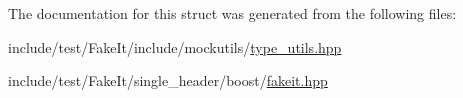 The documentation for this struct was generated from the following files\+:\begin{DoxyCompactItemize}
\item 
include/test/\+Fake\+It/include/mockutils/\mbox{\hyperlink{type__utils_8hpp}{type\+\_\+utils.\+hpp}}\item 
include/test/\+Fake\+It/single\+\_\+header/boost/\mbox{\hyperlink{single__header_2boost_2fakeit_8hpp}{fakeit.\+hpp}}\end{DoxyCompactItemize}
